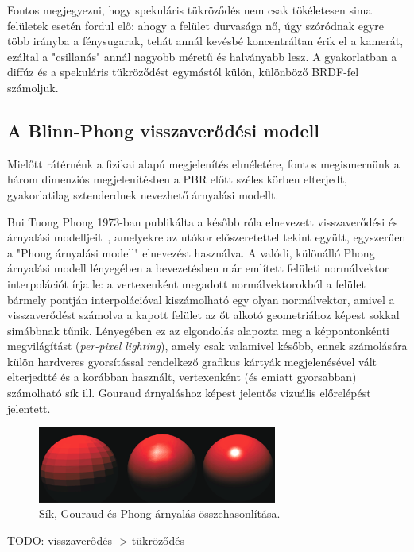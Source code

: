 Fontos megjegyezni, hogy spekuláris tükröződés nem csak tökéletesen sima felületek esetén fordul elő: ahogy a felület durvasága nő, úgy szóródnak egyre több irányba a fénysugarak, tehát annál kevésbé koncentráltan érik el a kamerát, ezáltal a "csillanás" annál nagyobb méretű és halványabb lesz. A gyakorlatban a diffúz és a spekuláris tükröződést egymástól külön, különböző BRDF-fel számoljuk.

\subsection{A Blinn-Phong visszaverődési modell}

Mielőtt rátérnénk a fizikai alapú megjelenítés elméletére, fontos megismernünk a három dimenziós megjelenítésben a PBR előtt széles körben elterjedt, gyakorlatilag sztenderdnek nevezhető árnyalási modellt.

Bui Tuong Phong 1973-ban publikálta a később róla elnevezett visszaverődési és árnyalási modelljeit~\cite{phong1975illumination}, amelyekre az utókor előszeretettel tekint együtt, egyszerűen a "Phong árnyalási modell" elnevezést használva. A valódi, különálló Phong árnyalási modell lényegében a bevezetésben már említett felületi normálvektor interpolációt írja le: a vertexenként megadott normálvektorokból a felület bármely pontján interpolációval kiszámolható egy olyan normálvektor, amivel a visszaverődést számolva a kapott felület az őt alkotó geometriához képest sokkal simábbnak tűnik. Lényegében ez az elgondolás alapozta meg a képpontonkénti megvilágítást (\textit{per-pixel lighting}), amely csak valamivel később, ennek számolására külön hardveres gyorsítással rendelkező grafikus kártyák megjelenésével vált elterjedtté és a korábban használt, vertexenként (és emiatt gyorsabban) számolható sík ill. Gouraud árnyaláshoz képest jelentős vizuális előrelépést jelentett.

\begin{figure}[!ht]
    \centering
    \includegraphics[width=0.7\textwidth]{images/flat_gouraud_phong.png}
    \caption{Sík, Gouraud és Phong árnyalás összehasonlítása. }
\end{figure}

TODO: visszaverődés -> tükröződés

